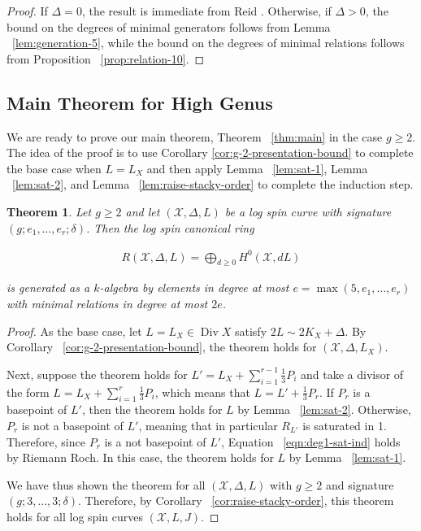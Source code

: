 \documentclass{amsart}
\theoremstyle{plain}
\newtheorem{thm}{Theorem}[section]
\theoremstyle{definition}
\theoremstyle{remark}
\numberwithin{equation}{section}
\newcommand\ssec{\subsection}
\DeclareMathOperator\di{Div}
\newcommand\sx{\mathscr X}
\newcommand{\halfcan}{L}
\begin{document}
\begin{proof}
If $\Delta = 0$, the result is immediate from Reid \cite[Theorem 3.4]
{reid:infinitesimal}. Otherwise, if $\Delta > 0$, the bound on the
degrees of minimal generators follows from Lemma
~\ref{lem:generation-5}, while the bound on the degrees of minimal
relations follows from Proposition ~\ref{prop:relation-10}.
\end{proof}

\ssec{Main Theorem for High Genus}
\label{ssec:g-high-main}

We are ready to prove our main theorem, Theorem ~\ref{thm:main} in the case
$g \geq 2$. The idea of the proof is to use Corollary \ref{cor:g-2-presentation-bound} to 
complete the base case when $L = \halfcan_X$ and then apply Lemma
~\ref{lem:sat-1}, Lemma ~\ref{lem:sat-2}, and Lemma
~\ref{lem:raise-stacky-order} to complete the induction step.

\begin{thm}
\label{thm:g-high-main}
Let $g \geq 2$ and let $(\sx, \Delta, \halfcan)$ be a log spin curve 
with signature $(g; e_1, \ldots, e_r; \delta)$. Then the
log spin canonical ring

\begin{align*}
	R(\sx, \Delta, \halfcan) = \bigoplus_{d \geq 0} H^0(\sx, d L )
\end{align*}

\noindent
is generated as a $k$-algebra by elements in degree at most $e =
\max(5, e_1, \ldots, e_r)$ with minimal relations in degree at most $2e$.
\end{thm}

%

\begin{proof}
As the base case, let $\halfcan=\halfcan_X \in \di X$ satisfy $2\halfcan \sim 2 K_X + \Delta$.
By Corollary ~\ref{cor:g-2-presentation-bound}, the theorem holds for $(\sx, \Delta,
\halfcan_X)$. 

Next, suppose the theorem holds for $\halfcan' = \halfcan_X+ \sum_{i=1}^{r-1} \frac{1}{3}P_i$ and take a divisor of the form $\halfcan = \halfcan_X + \sum_{i=1}^r \frac{1}{3} P_i$, which means that $\halfcan = \halfcan' + \frac{1}{3} P_r$.  If $P_r$ is a basepoint of $L'$, then the theorem holds for $\halfcan$ by Lemma ~\ref{lem:sat-2}.  
Otherwise, $P_r$ is not a basepoint of $\halfcan'$, meaning that in particular $R_{\halfcan'}$ is saturated in 1.
Therefore, since $P_r$ is a not basepoint of $\halfcan'$, Equation
~\ref{eqn:deg1-sat-ind} holds by Riemann Roch.
In this case, the theorem holds for $L$ by Lemma ~\ref{lem:sat-1}.

We have thus shown the theorem for all $(\sx, \Delta, \halfcan)$ with $g\ge 2$ and signature $(g;3,\ldots, 3;\delta)$. Therefore, by Corollary 
~\ref{cor:raise-stacky-order}, this theorem 
holds for all log spin curves $(\sx, L, J)$. 
\end{proof}
\end{document}
